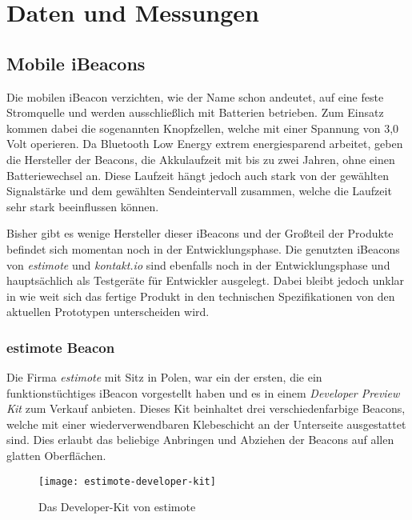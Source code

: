 \chapter{Daten und Messungen}
\label{chap:dataandmeasure}

\section{Mobile iBeacons}
\label{sec:dataandmeasurement:mobilebeacon}
Die mobilen iBeacon verzichten, wie der Name schon andeutet, auf eine feste Stromquelle und werden ausschließlich mit Batterien betrieben.
Zum Einsatz kommen dabei die sogenannten Knopfzellen, welche mit einer Spannung von 3,0 Volt operieren.
Da Bluetooth Low Energy extrem energiesparend arbeitet, geben die Hersteller der Beacons, die Akkulaufzeit mit bis zu zwei Jahren, ohne einen Batteriewechsel an. Diese Laufzeit hängt jedoch auch stark von der gewählten Signalstärke und dem gewählten Sendeintervall zusammen, welche die Laufzeit sehr stark beeinflussen können.

Bisher gibt es wenige Hersteller dieser iBeacons und der Großteil der Produkte befindet sich momentan noch in der Entwicklungsphase. Die genutzten iBeacons von \emph{estimote} und \emph{kontakt.io} sind ebenfalls noch in der Entwicklungsphase und hauptsächlich als Testgeräte für Entwickler ausgelegt. Dabei bleibt jedoch unklar in wie weit sich das fertige Produkt in den technischen Spezifikationen von den aktuellen Prototypen unterscheiden wird.

\subsection{estimote Beacon}
\label{sec:dataandmeasurement:mobilebeacon:estimote}
Die Firma \emph{estimote} mit Sitz in Polen, war ein der ersten, die ein funktionstüchtiges iBeacon vorgestellt haben und es in einem \emph{Developer Preview Kit} zum Verkauf anbieten.
Dieses Kit beinhaltet drei verschiedenfarbige Beacons, welche mit einer wiederverwendbaren Klebeschicht an der Unterseite ausgestattet sind. Dies erlaubt das beliebige Anbringen und Abziehen der Beacons auf allen glatten Oberflächen.
\begin{figure}[htb!]
		\centering
	\texttt{[image: estimote-developer-kit]}
	\caption{Das Developer-Kit von estimote}
	\label{estimote-developer-kit}
\end{figure}

